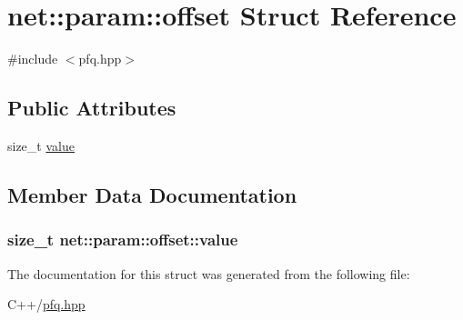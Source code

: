 \hypertarget{structnet_1_1param_1_1offset}{\section{net\-:\-:param\-:\-:offset Struct Reference}
\label{structnet_1_1param_1_1offset}
}


{\ttfamily \#include $<$pfq.\-hpp$>$}

\subsection*{Public Attributes}
\begin{DoxyCompactItemize}
\item 
size\-\_\-t \hyperlink{structnet_1_1param_1_1offset_ae2ed6199b781efd137a3485b2d581290}{value}
\end{DoxyCompactItemize}


\subsection{Member Data Documentation}
\hypertarget{structnet_1_1param_1_1offset_ae2ed6199b781efd137a3485b2d581290}{
\subsubsection[{value}]{\setlength{\rightskip}{0pt plus 5cm}size\-\_\-t net\-::param\-::offset\-::value}}\label{structnet_1_1param_1_1offset_ae2ed6199b781efd137a3485b2d581290}


The documentation for this struct was generated from the following file\-:\begin{DoxyCompactItemize}
\item 
C++/\hyperlink{pfq_8hpp}{pfq.\-hpp}\end{DoxyCompactItemize}
